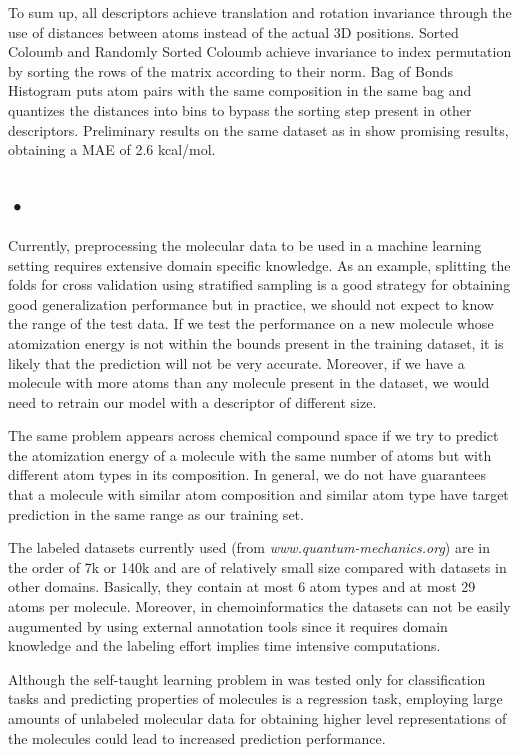 \documentclass[10pt,journal,a4paper]{IEEEtran}
\begin{document}
To sum up, all descriptors achieve translation and rotation invariance through the use of
distances between atoms instead of the actual 3D positions. Sorted Coloumb and Randomly Sorted Coloumb achieve invariance to index permutation by sorting the rows of the matrix according to their norm. Bag of Bonds Histogram puts atom pairs with the same composition in the same bag and quantizes the distances into bins to bypass the sorting step present in other descriptors. Preliminary results on the same dataset as in \cite{montavon2012learning}  show promising results, obtaining a MAE of 2.6 kcal/mol.

\subsection*{•}
Currently, preprocessing the molecular data to be used in a machine learning setting requires extensive domain specific knowledge. As an example, splitting the folds for cross validation using stratified sampling is a good strategy for obtaining good generalization performance but in practice, we should not expect to know the range of the test data. If we test the performance on a new molecule whose atomization energy is not within the bounds present in the training dataset, it is likely that the prediction will not be very accurate. Moreover, if we have a molecule with more atoms than any molecule present in the dataset, we would need to retrain our model with a  descriptor of different size. 

The same problem appears across chemical compound space if we try to predict the atomization energy of a molecule with the same number of atoms but with different atom types in its composition. In general, we do not have guarantees that a molecule with similar atom composition and similar atom type have target prediction in the same range as our training set.

The labeled datasets currently used (from \textit{www.quantum-mechanics.org}) are in the order of 7k or 140k and are of relatively small size compared with datasets in other domains. Basically, they contain at most 6 atom types and at most 29 atoms per molecule. Moreover, in chemoinformatics the datasets can not be easily augumented by using external annotation tools since it requires domain knowledge and the labeling effort implies time intensive computations.

Although the self-taught learning problem in \cite{selftaughtl} was tested only for classification tasks and predicting properties of molecules is a regression task, employing large amounts of unlabeled molecular data for obtaining higher level representations of the molecules could lead to increased prediction performance.
\end{document}
